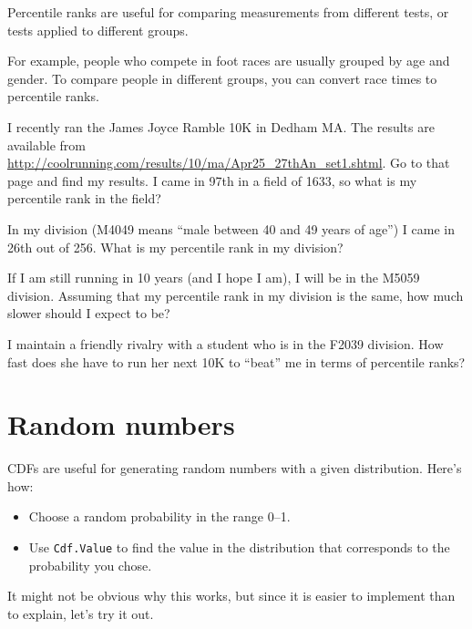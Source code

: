 \documentclass[12pt]{book}
\begin{document}
Percentile ranks are useful for comparing measurements from
different tests, or tests applied to different groups.

For example, people who compete in foot races are usually grouped by
age and gender.  To compare people in different groups, you can convert
race times to percentile ranks.

\begin{exercise}
I recently ran the James Joyce Ramble 10K
in Dedham MA.  The results are available from
\url{http://coolrunning.com/results/10/ma/Apr25_27thAn_set1.shtml}.
Go to that page and find my results.  I came in 97th in a field
of 1633, so what is my percentile rank in the field?

In my division (M4049 means ``male between 40 and 49 years of age'')
I came in 26th out of 256.  What is my percentile rank in my division?

If I am still running in 10 years (and I hope I am), I will be in
the M5059 division.  Assuming that my percentile rank in my division
is the same, how much slower should I expect to be?

I maintain a friendly rivalry with a student who is in the
F2039 division.  How fast does she have to run her next 10K to
``beat'' me in terms of percentile ranks?

\end{exercise}


\section{Random numbers}
\label{random}

CDFs are useful for generating random numbers with a given
distribution.  Here's how:

\begin{itemize}

\item Choose a random probability in the range 0--1.

\item Use {\tt Cdf.Value} to find the value in the distribution
that corresponds to the probability you chose.

\end{itemize}

It might not be obvious why this works, but since it is easier
to implement than to explain, let's try it out.
\end{document}
